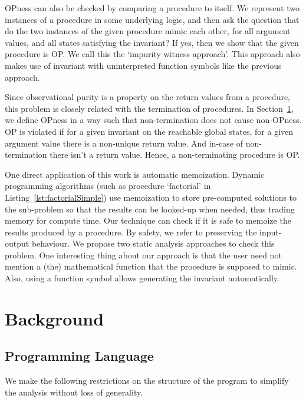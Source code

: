 \documentclass{llncs}
\begin{document}
OPness can also be checked by comparing a procedure to itself. We
represent two instances of a procedure in some underlying logic, and
then ask the question that do the two instances of the given procedure
mimic each other, for all argument values, and all states satisfying
the invariant? If yes, then we show that the given procedure is OP. We
call this the `impurity witness approach'.  This approach also makes
use of invariant with uninterpreted function symbols like the previous
approach.

Since observational purity is a property on the return values from a
procedure, this problem is closely related with the termination of
procedures. In Section~\ref{sec:background}, we define OPness in a way
such that non-termination does not cause non-OPness. OP is violated if
for a given invariant on the reachable global states, for a given
argument value there is a non-unique return value. And in-case of
non-termination there isn't a return value. Hence, a non-terminating
procedure is OP.

One direct application of this work is automatic memoization. Dynamic
programming algorithms (such as procedure `factorial' in
Listing~\ref{lst:factorialSimple}) use memoization to store
pre-computed solutions to the sub-problem so that the results can be
looked-up when needed, thus trading memory for compute time. Our
technique can check if it is safe to memoize the results produced by a
procedure. By safety, we refer to preserving the input-output
behaviour. We propose two static analysis approaches to check this
problem. One interesting thing about our approach is that the user
need not mention a (the) mathematical function that the procedure is
supposed to mimic. Also, using a function symbol allows generating the
invariant automatically.

\section{Background} \label{sec:background}

\subsection{Programming Language}
We make the following restrictions on the structure of the program to
simplify the analysis without loss of generality.
\end{document}
